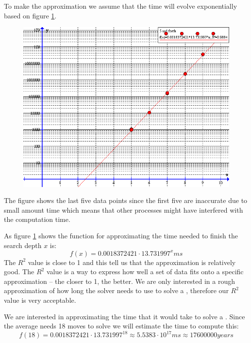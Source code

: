 To make the approximation we assume that the time will evolve exponentially based on figure \ref{fig:timeFunction}.

\begin{figure}[htb]
	\centering
		\includegraphics[scale=0.5]{input/pics/timeFunction}
	\caption{}
	\label{fig:timeFunction}
\end{figure}

The figure shows the last five data points since the first five are inaccurate due to small amount time which means that other processes might have interfered with the computation time.

As figure \ref{fig:timeFunction} shows the function for approximating the time needed to finish the search depth $x$ is:
\[
f(x)=0.0018372421 \cdot 13.731997^{x} ms
\]
The $R^2$ value is close to 1 and this tell us that the approximation is relatively good. The $R^2$ value is a way to express how well a set of data fits onto a specific approximation -- the closer to 1, the better. We are only interested in a rough approximation of how long the solver needs to use to solve a \rubik{}, therefore our $R^2$ value is very acceptable.

We are interested in approximating the time that it would take to solve a \rubik{}. Since the average \rubik{} needs 18 moves to solve \cite{kociemba09} we will estimate the time to compute this:
\[
f(18) = 0.0018372421 \cdot 13.731997^{18} \approx 5.5383 \cdot 10^{17} ms \approx 17600000 years
\]


